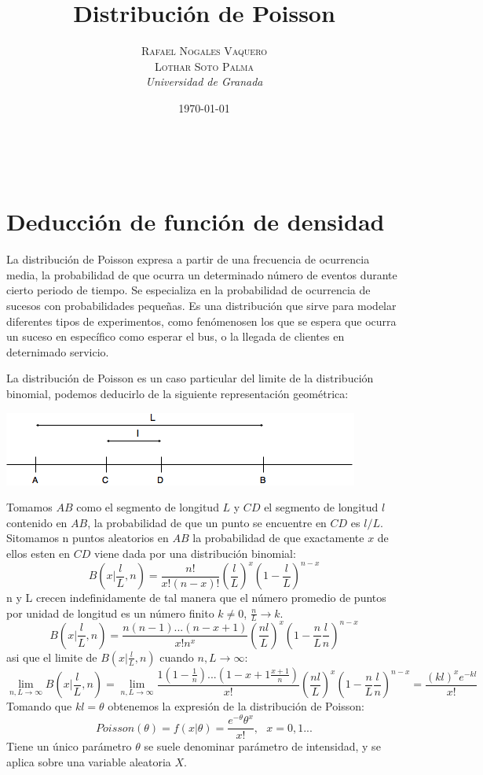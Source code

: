 \documentclass[a4paper, 10pt]{article} %
\title{\textbf{Distribución de Poisson}\\ %
\vspace{20 pt}
} %
\author{\textsc{Rafael Nogales Vaquero\\
Lothar Soto Palma} %
\\{\textit{Universidad de Granada}}} %
\date{\today} %
\makeatletter
\renewcommand{\maketitle}{ %
\begin{center} %
{\Huge\@title} %
\end{center}

\vspace{20pt} %

\begin{flushright} %
{\large\@author} %
\\\@date %

\vspace{40pt} %
\end{flushright}
\renewcommand{\baselinestretch}{0.5}

}
\newcounter{def}
\makeatother
\begin{document}
\maketitle
\tableofcontents
\setcounter{page}{1}
\pagebreak
\section{Deducción de función de densidad}
La distribución de Poisson expresa a partir de una frecuencia de ocurrencia media, la probabilidad de que ocurra un determinado número de eventos durante cierto periodo de tiempo. Se especializa en la probabilidad de ocurrencia de sucesos con probabilidades pequeñas. Es una distribución que sirve para modelar diferentes tipos de experimentos, como fenómenosen los que se espera que ocurra un suceso en específico como esperar el bus, o la llegada de clientes en deternimado servicio.

La distribución de Poisson es un caso particular del limite de la distribución binomial, podemos deducirlo de la siguiente representación geométrica:\\
\begin{center}
\includegraphics[scale=0.6]{1.png} 
\end{center}
Tomamos $AB$ como el segmento de longitud $L$ y $CD$ el segmento de longitud $l$ contenido en $AB$, la probabilidad de que un punto se encuentre en $CD$ es $l/L$. Sitomamos n puntos aleatorios en $AB$ la probabilidad de que exactamente $x$ de ellos esten en $CD$ viene dada por una distribución binomial:
$$B(x|\frac{l}{L},n)=\frac{n!}{x!(n-x)!}(\frac{l}{L})^x(1-\frac{l}{L})^{n-x}$$
n y L crecen indefinidamente de tal manera que el número promedio de puntos por unidad de longitud es un número finito $k \neq 0$, $\frac{n}{L}\rightarrow k$.
$$B(x|\frac{l}{L},n)=\frac{n(n-1)...(n-x+1)}{x!n^x}(\frac{nl}{L})^x(1-\frac{n}{L}\frac{l}{n})^{n-x}$$
asi que el limite de $B(x|\frac{l}{L},n)$ cuando $n,L\rightarrow \infty$:
$$\lim_{n,L\rightarrow \infty}B(x|\frac{l}{L},n) = \lim_{n,L\rightarrow \infty}\frac{1(1-\frac{1}{n})...(1-x+1\frac{x+1}{n})}{x!}(\frac{nl}{L})^x(1-\frac{n}{L}\frac{l}{n})^{n-x}=\frac{(kl)^xe^{-kl}}{x!}$$
Tomando que $kl=\theta$ obtenemos la expresión de la distribución de Poisson:
$$Poisson(\theta)=f(x|\theta)=\dfrac{e^{-\theta}\theta^x}{x!},\ \ \ x=0,1...$$
Tiene un único parámetro $\theta$ se suele denominar parámetro de intensidad, y se aplica sobre una variable aleatoria $X$.
\end{document}
